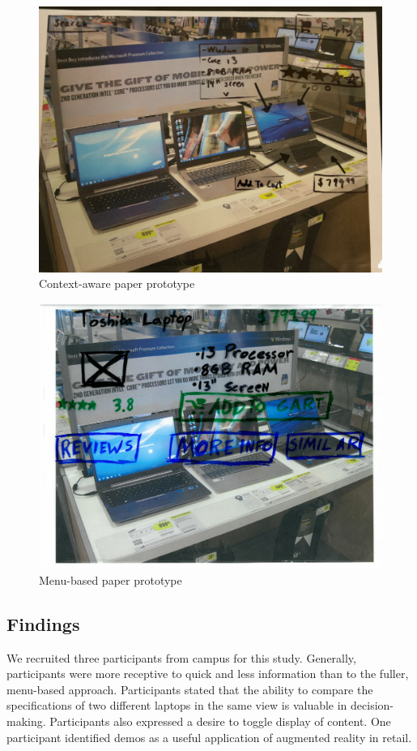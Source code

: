 \begin{figure}
	\includegraphics[width=0.9\columnwidth]{figures/LowFiContext}
	\caption{Context-aware paper prototype}
	\label{fig:LowFiContext}
\end{figure}
\begin{figure}
	\includegraphics[width=0.9\columnwidth]{figures/LowFiMenu}
	\caption{Menu-based paper prototype}
	\label{fig:LowFiMenu}
\end{figure}

\subsection{Findings}
We recruited three participants from campus for this study. Generally, participants were more receptive to quick and less information than to the fuller, menu-based approach. Participants stated that the ability to compare the specifications of two different laptops in the same view is valuable in decision-making. Participants also expressed a desire to toggle display of content. One participant identified demos as a useful application of augmented reality in retail.